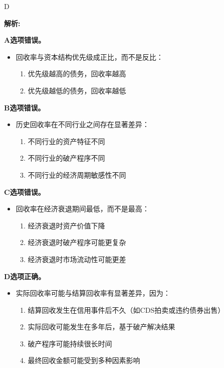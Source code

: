 \documentclass{article}
\newenvironment{explanation}
{\textbf{解析:}\par}
{\par}
\begin{document}
\begin{correctanswer}
    D
\end{correctanswer}

\begin{explanation}
    \textbf{A选项错误。}
    \begin{itemize}
        \item 回收率与资本结构优先级成正比，而不是反比：
        \begin{enumerate}
            \item 优先级越高的债务，回收率越高
            \item 优先级越低的债务，回收率越低
        \end{enumerate}
    \end{itemize}
    
    \textbf{B选项错误。}
    \begin{itemize}
        \item 历史回收率在不同行业之间存在显著差异：
        \begin{enumerate}
            \item 不同行业的资产特征不同
            \item 不同行业的破产程序不同
            \item 不同行业的经济周期敏感性不同
        \end{enumerate}
    \end{itemize}
    
    \textbf{C选项错误。}
    \begin{itemize}
        \item 回收率在经济衰退期间最低，而不是最高：
        \begin{enumerate}
            \item 经济衰退时资产价值下降
            \item 经济衰退时破产程序可能更复杂
            \item 经济衰退时市场流动性可能更差
        \end{enumerate}
    \end{itemize}
    
    \textbf{D选项正确。}
    \begin{itemize}
        \item 实际回收率可能与结算回收率有显著差异，因为：
        \begin{enumerate}
            \item 结算回收发生在信用事件后不久（如CDS拍卖或违约债券出售）
            \item 实际回收可能发生在多年后，基于破产解决结果
            \item 破产程序可能持续很长时间
            \item 最终回收金额可能受到多种因素影响
        \end{enumerate}
    \end{itemize}
\end{explanation}
\end{document}
